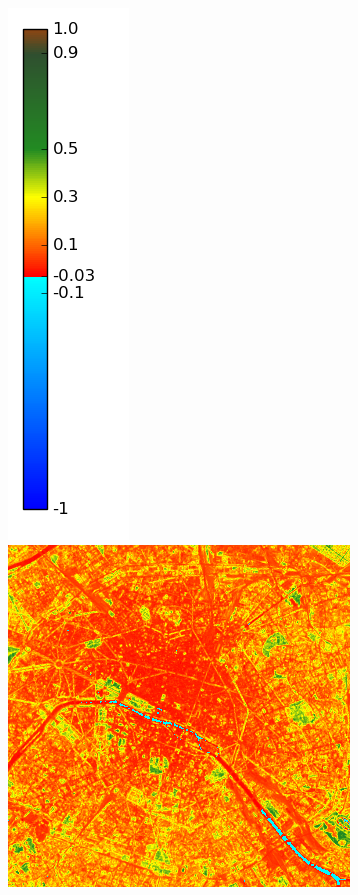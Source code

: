 \documentclass{book}
\begin{document}
\begin{figure}[H]
{\includegraphics[scale=0.2]{images/colormap.png}
\includegraphics[scale=0.25]{images/Paris/06_ndvi.png}
}
\end{figure}
\end{document}
